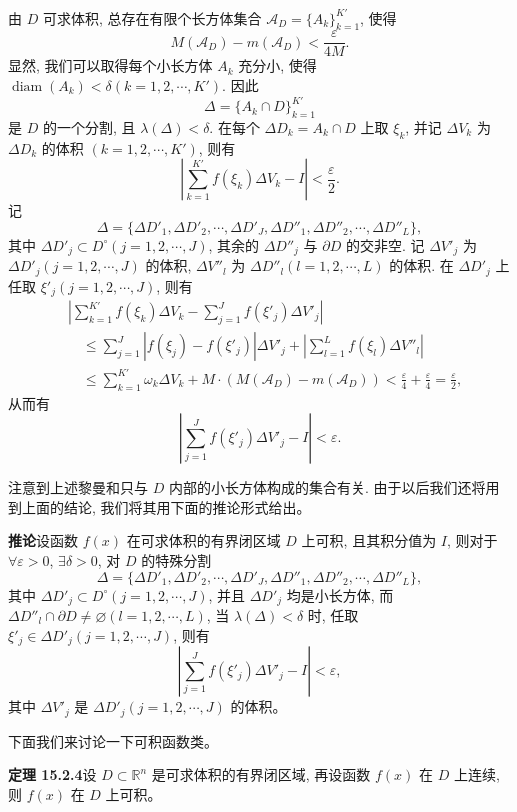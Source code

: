 \documentclass[UTF8,12pt,a4paper,fontset=fandol]{ctexart}
\begin{document}
由 $D$ 可求体积, 总存在有限个长方体集合 $\mathcal A_D=\{A_k\}_{k=1}^{K'}$, 使得
\[
  M(\mathcal A_D)-m(\mathcal A_D)<\frac{\varepsilon}{4M}.
\]
显然, 我们可以取得每个小长方体 $A_k$ 充分小, 使得 $\operatorname{diam}(A_k)<\delta(k=1,2,\cdots,K')$. 因此
\[
  \Delta=\{A_k\cap D\}_{k=1}^{K'}
\]
是 $D$ 的一个分割, 且 $\lambda(\Delta)<\delta$. 在每个 $\Delta D_k=A_k\cap D$ 上取 $\xi_k$, 并记 $\Delta V_k$ 为 $\Delta D_k$ 的体积 $(k=1,2,\cdots,K')$, 则有
\[
  \left|\sum_{k=1}^{K'} f(\xi_k)\Delta V_k-I\right|<\frac{\varepsilon}{2}.
\]
记
\[
  \Delta=\{\Delta D'_1,\Delta D'_2,\cdots,\Delta D'_J,\Delta D''_1,\Delta D''_2,\cdots,\Delta D''_L\},
\]
其中 $\Delta D'_j\subset D^\circ(j=1,2,\cdots,J)$, 其余的 $\Delta D''_j$ 与 $\partial D$ 的交非空. 记 $\Delta V'_j$ 为 $\Delta D'_j(j=1,2,\cdots,J)$ 的体积, $\Delta V''_l$ 为 $\Delta D''_l(l=1,2,\cdots,L)$ 的体积. 在 $\Delta D'_j$ 上任取 $\xi'_j(j=1,2,\cdots,J)$, 则有
\[
\begin{aligned}
  &\left|\sum_{k=1}^{K'}f(\xi_k)\Delta V_k-\sum_{j=1}^J f(\xi'_j)\Delta V'_j\right|\\
  &\quad\leqslant
  \sum_{j=1}^J|f(\xi_j)-f(\xi'_j)|\Delta V'_j+
  \left|\sum_{l=1}^L f(\xi_l)\Delta V''_l\right|\\
  &\quad\leqslant
  \sum_{k=1}^{K'}\omega_k\Delta V_k+M\cdot(M(\mathcal A_D)-m(\mathcal A_D))
  <\frac{\varepsilon}{4}+\frac{\varepsilon}{4}=\frac{\varepsilon}{2},
\end{aligned}
\]
从而有
\[
  \left|\sum_{j=1}^J f(\xi'_j)\Delta V'_j-I\right|<\varepsilon.
\]

注意到上述黎曼和只与 $D$ 内部的小长方体构成的集合有关. 由于以后我们还将用到上面的结论, 我们将其用下面的推论形式给出。

\noindent\textbf{推论}\quad 设函数 $f(x)$ 在可求体积的有界闭区域 $D$ 上可积, 且其积分值为 $I$, 则对于 $\forall\varepsilon>0$, $\exists\delta>0$, 对 $D$ 的特殊分割
\[
  \Delta=\{\Delta D'_1,\Delta D'_2,\cdots,\Delta D'_J,\Delta D''_1,\Delta D''_2,\cdots,\Delta D''_L\},
\]
其中 $\Delta D'_j\subset D^\circ(j=1,2,\cdots,J)$, 并且 $\Delta D'_j$ 均是小长方体, 而 $\Delta D''_l\cap\partial D\ne\varnothing(l=1,2,\cdots,L)$, 当 $\lambda(\Delta)<\delta$ 时, 任取 $\xi'_j\in\Delta D'_j(j=1,2,\cdots,J)$, 则有
\[
  \left|\sum_{j=1}^J f(\xi'_j)\Delta V'_j-I\right|<\varepsilon,
\]
其中 $\Delta V'_j$ 是 $\Delta D'_j(j=1,2,\cdots,J)$ 的体积。

下面我们来讨论一下可积函数类。

\noindent\textbf{定理 15.2.4}\quad 设 $D\subset\mathbb R^n$ 是可求体积的有界闭区域, 再设函数 $f(x)$ 在 $D$ 上连续, 则 $f(x)$ 在 $D$ 上可积。
\end{document}
